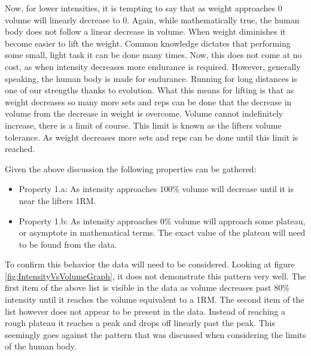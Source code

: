 Now, for lower intensities, it is tempting to say that as weight approaches $0$ volume will linearly decrease to $0$. Again, while mathematically true, the human body does not follow a linear decrease in volume. When weight diminishes it become easier to lift the weight. Common knowledge dictates that performing some small, light task it can be done many times. Now, this does not come at no cost, as when intensity decreases more endurance is required. However, generally speaking, the human body is made for endurance. Running for long distances is one of our strengths thanks to evolution. What this means for lifting is that as weight decreases so many more sets and reps can be done that the decrease in volume from the decrease in weight is overcome. Volume cannot indefinitely increase, there is a limit of course. This limit is known as the lifters volume tolerance. As weight decreases more sets and reps can be done until this limit is reached.

Given the above discussion the following properties can be gathered:

\begin{itemize}
	\item Property 1.a:  As intensity approaches $100\%$  volume will decrease until it is near the lifters 1RM.
	\item Property 1.b: As intensity approaches $0\%$ volume will approach some plateau, or asymptote in mathematical terms. The exact value of the plateau will need to be found from the data.
\end{itemize}

To confirm this behavior the data will need to be considered. Looking at figure \ref{fig:IntensityVsVolumeGraph}, it does not demonstrate this pattern very well. The first item of the above list is visible in the data as volume decreases past $80$\% intensity until it reaches the volume equivalent to a 1RM. The second item of the list however does not appear to be present in the data. Instead of reaching a rough plateau it reaches a peak and drops off linearly past the peak. This seemingly goes against the pattern that was discussed when considering the limits of the human body.

